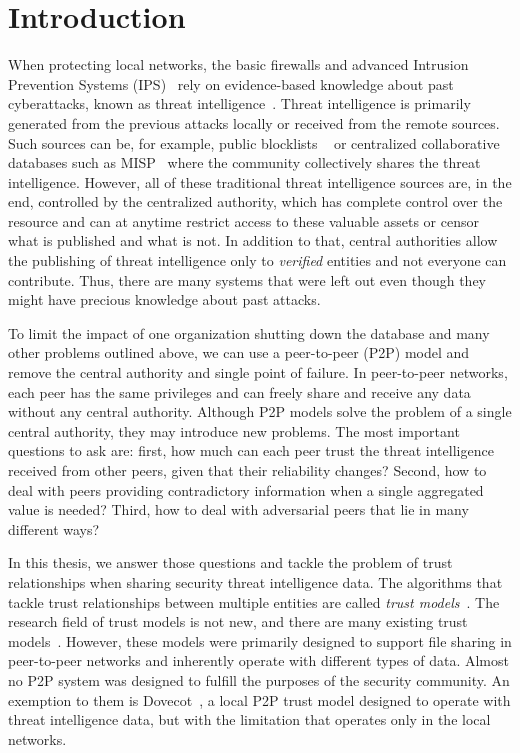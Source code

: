 \chapter{Introduction}
\label{ch:introduction}

When protecting local networks, the basic firewalls and advanced Intrusion Prevention Systems (IPS)~\cite{zhang2004intrusion} rely on evidence-based knowledge about past cyberattacks, known as threat intelligence~\cite{threatintelligence}. Threat intelligence is primarily generated from the previous attacks locally or received from the remote sources.
Such sources can be, for example, public blocklists ~\cite{abuseipdb, dataplane, binarydefense} or centralized collaborative databases such as MISP~\cite{wagner2016misp} where the community collectively shares the threat intelligence.
However, all of these traditional threat intelligence sources are, in the end, controlled by the centralized authority, which has complete control over the resource and can at anytime restrict access to these valuable assets or censor what is published and what is not.
In addition to that, central authorities allow the publishing of threat intelligence only to \textit{verified} entities and not everyone can contribute. Thus, there are many systems that were left out even though they might have precious knowledge about past attacks.

To limit the impact of one organization shutting down the database and many other problems outlined above, we can use a peer-to-peer (P2P) model and remove the central authority and single point of failure.
In peer-to-peer networks, each peer has the same privileges and can freely share and receive any data without any central authority.
Although P2P models solve the problem of a single central authority, they may introduce new problems. The most important questions to ask are: first, how much can each peer trust the threat intelligence received from other peers, given that their reliability changes? Second, how to deal with peers providing contradictory information when a single aggregated value is needed? Third, how to deal with adversarial peers that lie in many different ways?

In this thesis, we answer those questions and tackle the problem of trust relationships when sharing security threat intelligence data.
The algorithms that tackle trust relationships between multiple entities are called \textit{trust models}~\cite{wang2003trust}.
The research field of trust models is not new, and there are many existing trust models~\cite{abera2019sadan, sort, christensen2014hybrid, 1562680, huynh2006integrated, kamvar2003eigentrust, li2014design, pinyol2013computational, xiong2004peertrust}.
However, these models were primarily designed to support file sharing in peer-to-peer networks and inherently operate with different types of data. Almost no P2P system was designed to fulfill the purposes of the security community.
An exemption to them is Dovecot~\cite{dita}, a local P2P trust model designed to operate with threat intelligence data, but with the limitation that operates only in the local networks.

